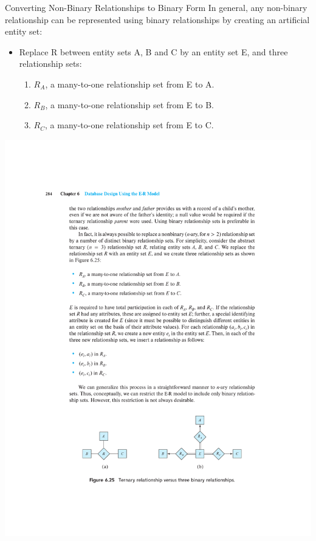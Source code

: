 \documentclass{beamer}
\begin{document}
\begin{frame}{Converting Non-Binary Relationships to Binary Form}
    In general, any non-binary relationship can be represented using binary relationships by creating an artificial entity set:
    \begin{itemize}
        \item Replace R between entity sets A, B and C by an entity set E, and three relationship sets:
        \begin{enumerate}
            \item $R_A$, a many-to-one relationship set from E to A.
            \item $R_B$, a many-to-one relationship set from E to B.
            \item $R_C$, a many-to-one relationship set from E to C.
        \end{enumerate}
    \end{itemize}
    \includegraphics[trim={5cm 4.5cm 4.75cm 19cm}, clip, width=\textwidth]{figures/ternary}
\end{frame}
\end{document}
